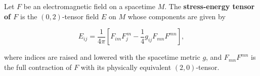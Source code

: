 Let $F$ be an electromagnetic field on a spacetime $M$. The \textbf{stress-energy tensor of $F$} is the $(0,2)$-tensor field $E$ on $M$ whose components are given by

$$E_{ij} = \frac{1}{4\pi} \left[ F_{im} F_j^{\,m} - \frac{1}{4} g_{ij} F_{mn} F^{mn} \right],$$

where indices are raised and lowered with the spacetime metric $g$, and $F_{mn}F^{mn}$ is the full contraction of $F$ with its physically equivalent $(2,0)$-tensor.
